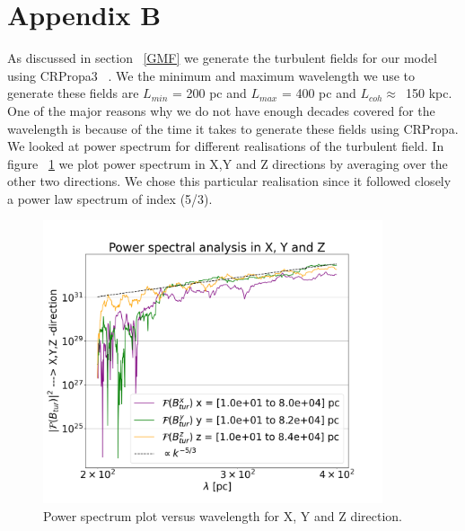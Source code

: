 \documentclass[12pt, a4 paper]{mnras}
\begin{document}
\section{Appendix B}\label{Appendix_B}
As discussed in section ~\ref{GMF} we generate the turbulent fields for our model using CRPropa3 ~\cite{CRPropa3_2016}. We the minimum and maximum wavelength we use to generate these fields are 
$L_{min}$ = 200 pc and $L_{max}$ = 400 pc and $L_{coh} \approx $~150 kpc. One of the major reasons why we do not have enough decades covered for the wavelength is because of the time it takes to generate these fields using CRPropa. 
We looked at power spectrum for different realisations of the turbulent field. In figure ~\ref{fig:PowerSpectrum} we plot power spectrum in X,Y and Z directions by averaging over the other two directions. We chose this particular realisation since it followed closely a power law spectrum of index (5/3). 
\begin{figure}[h!]
    \centering
    \includegraphics[width = 10cm]{Images/Jan27_Test_PowerSpectrum_vs_lambda_seed_10_lmin_200.0lmax_400.0.png}
    \caption{Power spectrum plot versus wavelength for X, Y and Z direction.}
    \label{fig:PowerSpectrum}
\end{figure}

\iffalse
\end{document}
